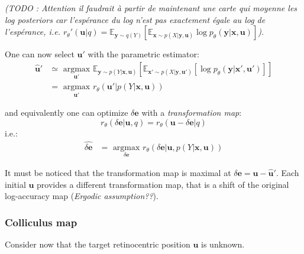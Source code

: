 
\emph{(TODO : Attention il faudrait à partir de maintenant une carte qui moyenne les log posteriors car l'espérance du log n'est pas exactement égale au log de l'espérance, i.e. $r_{\theta}'(\boldsymbol{u}|q) = \mathbb{E}_{\boldsymbol{y}\sim q(Y)} \left[\mathbb{E}_{ \boldsymbol{x} \sim p(X|\boldsymbol{y}, \boldsymbol{u})}  \log p_\theta(\boldsymbol{y}|\boldsymbol{x}, \boldsymbol{u}) \right]$).}
\newline

One can now select $\boldsymbol{u}'$ with the parametric estimator:
\begin{align*}
\hat{\boldsymbol{u}}' &\simeq \underset{\boldsymbol{u}' }{\text{ argmax }} 
\mathbb{E}_{\boldsymbol{y}\sim p(Y|\boldsymbol{x}, \boldsymbol{u})}  
\left[\mathbb{E}_{ \boldsymbol{x}' \sim p(X|\boldsymbol{y}, \boldsymbol{u}')}
\left[\log p_\theta(\boldsymbol{y}|\boldsymbol{x}', \boldsymbol{u}')\right]\right]\\
&= \underset{\boldsymbol{u}' }{\text{ argmax }}  r_\theta(\boldsymbol{u}'|p(Y|\boldsymbol{x}, \boldsymbol{u}))
\end{align*}




and equivalently one can optimize $\delta\boldsymbol{e}$ with a \emph{transformation map}:
$$r_\theta(\delta\boldsymbol{e}|\boldsymbol{u}, q) = r_\theta(\boldsymbol{u}-\delta\boldsymbol{e}|q)$$
i.e.:
\begin{align*}
\widehat{\delta\boldsymbol{e}} &= \underset{\delta\boldsymbol{e}}{\text{ argmax }} 
 r_\theta(\delta\boldsymbol{e}|\boldsymbol{u}, p(Y|\boldsymbol{x}, \boldsymbol{u}))
\end{align*}

It must be noticed that the transformation map is maximal at $\delta\boldsymbol{e} = \boldsymbol{u} - \hat{\boldsymbol{u}}'$. Each initial $\boldsymbol{u}$ provides a different transformation map, that is a shift of the original log-accuracy map (\emph{Ergodic assumption??}).
 
\subsubsection{Colliculus map}
Consider now that the target retinocentric position  $\boldsymbol{u}$ is unknown.



